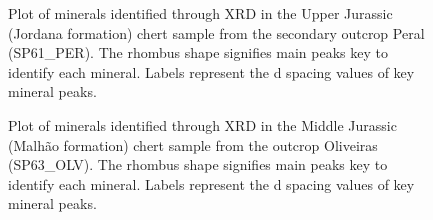 \documentclass[
  a4paper,
  DIV=11,
  numbers=noendperiod]{scrreprt}
\begin{document}
\begin{figure}


\caption{\label{fig-xrd-sp61}Plot of minerals identified through XRD in
the Upper Jurassic (Jordana formation) chert sample from the secondary
outcrop Peral (SP61\_PER). The rhombus shape signifies main peaks key to
identify each mineral. Labels represent the d spacing values of key
mineral peaks.}

\end{figure}%

\begin{figure}


\caption{\label{fig-xrd-sp63}Plot of minerals identified through XRD in
the Middle Jurassic (Malhão formation) chert sample from the outcrop
Oliveiras (SP63\_OLV). The rhombus shape signifies main peaks key to
identify each mineral. Labels represent the d spacing values of key
mineral peaks.}

\end{figure}%
\end{document}
